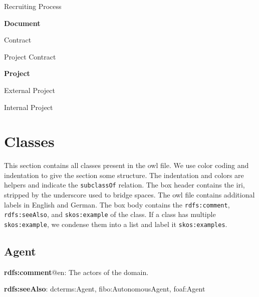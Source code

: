 \documentclass[a4paper, DIV=13, BCOR=0cm]{scrbook}
\newcommand{\relation}[1]{\texttt{#1}}
\newcommand{\prop}[1]{\texttt{#1}}
\begin{document}
\begin{multicols}{2}
\begin{compactitem}
\begin{compactitem}
			\item Recruiting Process
		\end{compactitem}
		\item \textbf{Document}
		\begin{compactitem}
			\item Contract
			\begin{compactitem}
				\item Project Contract
			\end{compactitem}
		\end{compactitem}
		\item \textbf{Project}
		\begin{compactitem}
			\item External Project
			\item Internal Project
		\end{compactitem}
	\end{compactitem}
\end{multicols}

\section{Classes}
This section contains all classes present in the \gls{owl} file. We use color coding and indentation to give the section some structure. The indentation and colors are helpers and indicate the \relation{subclassOf} relation. The box header contains the \gls{iri}, stripped by the underscore used to bridge spaces. The \gls{owl} file contains additional labels in English and German. The box body contains the \prop{rdfs:comment}, \prop{rdfs:seeAlso}, and \prop{skos:example} of the class. If a class has multiple \relation{skos:example}, we condense them into a list and label it \relation{skos:examples}.

\subsection{Agent}
\begin{mdframed}[style=onto, frametitle={Agent}]
	{%
		\begin{compactitem}
			\item \textbf{rdfs:comment}@en: The actors of the domain.
			\item \textbf{rdfs:seeAlso}: dcterms:Agent, fibo:AutonomousAgent, foaf:Agent
		\end{compactitem}
	} %
\end{mdframed}
\end{document}
